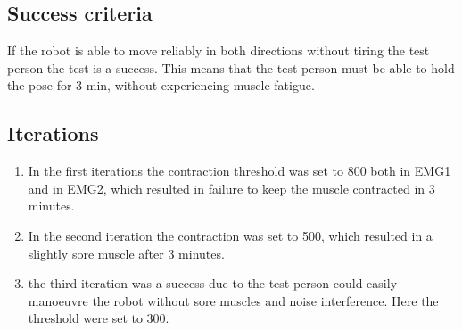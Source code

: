 \subsection*{Success criteria}
 If the robot is able to  move reliably in both directions without tiring the test person the test is a success. This means that the test person must be able to hold the pose for 3 min, without experiencing muscle fatigue. 
\subsection*{Iterations}
\begin{enumerate}
    \item In the first iterations the contraction threshold was set to 800 both in EMG1 and in EMG2, which resulted in failure to keep the muscle contracted in 3 minutes.
    \item In the second iteration the contraction was set to 500, which resulted in a slightly sore muscle after 3 minutes.
    \item the third iteration was a success due to the test person could easily manoeuvre the robot without sore muscles and noise interference. Here the threshold were set to 300.
\end{enumerate}
